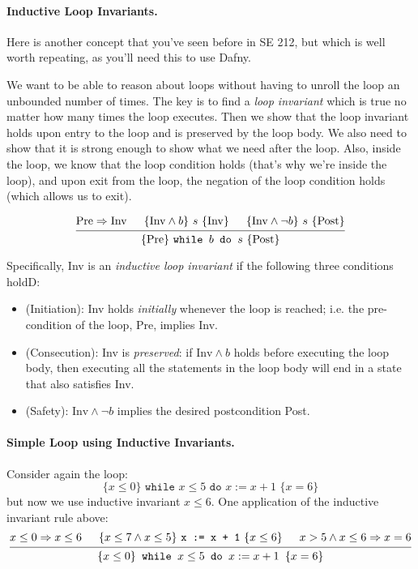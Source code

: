 \documentclass[11pt]{article}
\begin{document}
\paragraph{Inductive Loop Invariants.} Here is another concept that you've seen before in SE 212, but which is
well worth repeating, as you'll need this to use Dafny.

We want to be able to reason about loops without having to unroll the loop an unbounded number of times.
The key is to find a \emph{loop invariant} which is true no matter how many times the loop executes.
Then we show that the loop invariant holds upon entry to the loop and is preserved by the loop body.
We also need to show that it is strong enough to show what we need after the loop. Also, inside the loop,
we know that the loop condition holds (that's why we're inside the loop), and upon exit from the loop,
the negation of the loop condition holds (which allows us to exit).

\[
\begin{prooftree}
  \hypo{\mathrm{Pre} \Rightarrow \mathrm{Inv}}
  \hypo{\{ \mathrm{Inv} \wedge b \} ~s~ \{ \mathrm{Inv} \}}
  \hypo{\{ \mathrm{Inv} \wedge \neg b \} ~s~ \{ \mathrm{Post} \}}
  \infer3{\{ \mathrm{Pre} \} ~\texttt{while $b$ do $s$}~ \{ \mathrm{Post} \}}
\end{prooftree}
\]

Specifically, Inv is an \emph{inductive loop invariant} if the following three conditions holdD:
\begin{itemize}[noitemsep]
\item (Initiation): Inv holds \emph{initially} whenever the loop is reached; i.e. the pre-condition of the loop, Pre,
  implies Inv.
\item (Consecution): Inv is \emph{preserved}: if $\mathrm{Inv} \wedge b$ holds before executing the loop body, then executing all the statements in the loop body will end in a state that also satisfies Inv.
\item (Safety): $\mathrm{Inv} \wedge \neg b$ implies the desired postcondition Post.
\end{itemize}

\paragraph{Simple Loop using Inductive Invariants.} Consider again the loop:
\[ \{ x \leq 0 \} \texttt{~while $x \leq 5$ do $x := x + 1$~}  \{ x=6\} \]
but now we use inductive invariant $x \leq 6$. One application of the inductive invariant rule above:
\[
\begin{prooftree}
  \hypo{x \leq 0 \Rightarrow x \leq 6}
  \hypo{\{ x \leq 7 \wedge x \leq 5 \} ~\texttt{x := x + 1}~ \{ x \leq 6 \}}
  \hypo{x > 5 \wedge x \leq 6 \Rightarrow x = 6}
  \infer3{\{ x \leq 0\}\texttt{~while $x \leq 5$ do $x := x + 1$~}  \{ x=6\}}
\end{prooftree}
\]
\end{document}
